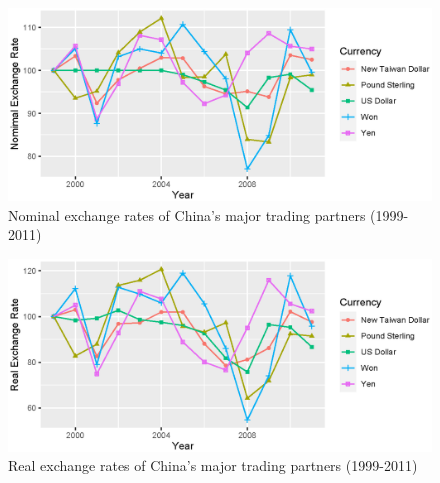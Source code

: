 \begin{figure}[htbp]
	\centering
	\includegraphics[width=1\textwidth]{figure/figure1.eps}
	\caption{Nominal exchange rates of China's major trading partners (1999-2011)}
	\label{fig3.1}
\end{figure}

\begin{figure}[htbp]
	\centering
	\includegraphics[width=1\textwidth]{figure/figure2.eps}
	\caption{Real exchange rates of China's major trading partners (1999-2011)}
	\label{fig3.2}
\end{figure}
